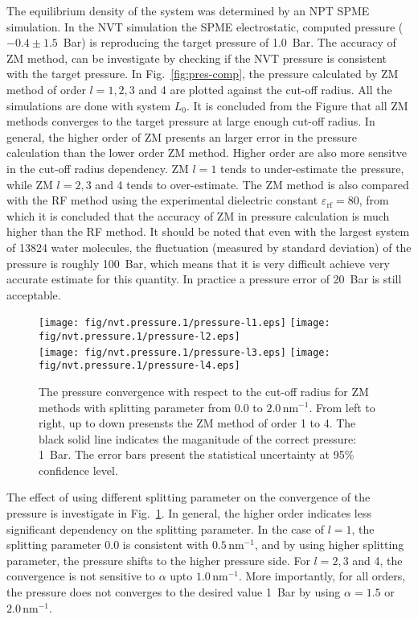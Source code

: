 \documentclass[aip,jcp,a4paper,preprint,unsortedaddress,onecolumn,fleqn]{revtex4-1}
\newcommand{\systemla}{L_0}
\begin{document}
The equilibrium density of the system was determined by an NPT SPME
simulation.  In the NVT simulation the SPME electrostatic, computed
pressure ($-0.4\pm 1.5$~Bar) is reproducing the target pressure of
1.0~Bar.  The accuracy of ZM method, can be investigate by checking if
the NVT pressure is consistent with the target pressure.  In
Fig.~\ref{fig:pres-comp}, the pressure calculated by ZM method of
order $l=1,2,3$ and 4 are plotted against the cut-off radius.
All the  simulations are done with system $\systemla$.
It is concluded from the Figure that all ZM methods converges to the
target pressure at large enough cut-off radius.
In general, the higher order of ZM presents an larger error in the pressure calculation than
the lower order ZM method.
Higher order are also more sensitve in the  cut-off radius dependency.
ZM $l=1$ tends to under-estimate the pressure, while ZM $l=2,3$ and 4 tends to over-estimate.
The ZM method is also compared with
the RF method using the experimental dielectric constant $\varepsilon_{\textrm{rf}} = 80$, 
from which it is concluded that the accuracy of ZM in pressure calculation is much higher
than the RF method.
It should be noted that even with the largest system of 13824 water molecules,
the fluctuation (measured by standard deviation) of the pressure is roughly 100~Bar, which means that it is
very difficult achieve very accurate estimate for this quantity. In practice a pressure error of 20~Bar is
still acceptable. 

\begin{figure}
  \centering
  \texttt{[image: fig/nvt.pressure.1/pressure-l1.eps]}
  \texttt{[image: fig/nvt.pressure.1/pressure-l2.eps]}\\
  \texttt{[image: fig/nvt.pressure.1/pressure-l3.eps]}
  \texttt{[image: fig/nvt.pressure.1/pressure-l4.eps]}
  \caption{The pressure convergence with respect to the cut-off radius
    for ZM methods with  splitting parameter from $0.0$ to $2.0\,\textrm{nm}^{-1}$.
    From left to right, up to down presensts the ZM method of order 1 to 4.
    The black solid line indicates the maganitude  of the correct pressure: 1~Bar.
    The error bars present the statistical uncertainty at 95\% confidence level.
  }
  \label{fig:pres-l1}
\end{figure}

The effect of using different splitting parameter on the convergence
of the pressure is investigate in Fig.~\ref{fig:pres-l1}.
In general, the higher order indicates less significant dependency on the splitting parameter.
In the case of $l=1$, the splitting parameter 0.0 is consistent with  $0.5\,\textrm{nm}^{-1}$, and
by using higher splitting parameter, the pressure shifts to the higher pressure side.
For $l=2,3$ and 4, the convergence is not sensitive to $\alpha$ upto  $1.0\,\textrm{nm}^{-1}$.
More importantly, for all orders,
the pressure does not converges to the desired value 1~Bar by using $\alpha = 1.5$ or $2.0\,\textrm{nm}^{-1}$.
\end{document}
